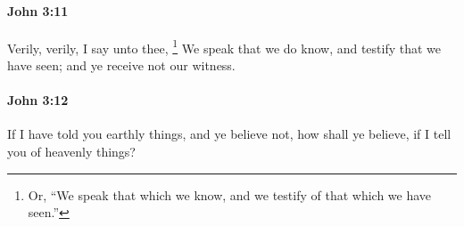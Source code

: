 		\paragraph{John 3:11} %
			\label{JOHN-3-11}

			Verily, verily, I say unto thee,
				\footnote{%
					Or, ``We speak that which we know, and we testify of that which we have seen.''
					}%
			We speak that we do know, and testify that we have seen; and ye receive not our witness.

			\begin{framed}
			\scriptsize
				\begin{compactdesc}
					\item[SBLG] 
				\end{compactdesc}
			\end{framed}

		\paragraph{John 3:12} %
			\label{JOHN-3-12}

			If I have told you earthly things, and ye believe not, how shall ye believe, if I tell you of heavenly things?

